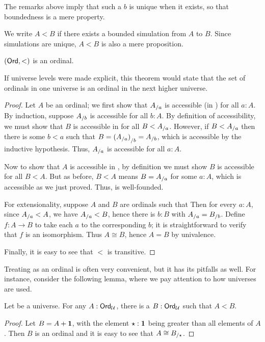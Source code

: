 The remarks above imply that such a $b$ is unique when it exists, so that boundedness is a mere property.

We write $A<B$ if there exists a bounded simulation from $A$ to $B$.
Since simulations are unique, $A<B$ is also a mere proposition.

\begin{thm}\label{thm:ordord}
  $(\mathsf{Ord},<)$ is an ordinal.
\end{thm}

\begin{rmk}
  If universe levels were made explicit, this theorem would state that the set of ordinals in one universe is an ordinal in the next higher universe.
\end{rmk}

\begin{proof}
  Let $A$ be an ordinal; we first show that ${A}_{/a}$ is accessible (in \ord) for all $a:A$.
  By induction, suppose ${A}_{/b}$ is accessible for all $b:A$.
  By definition of accessibility, we must show that $B$ is accessible in \ord for all $B<{A}_{/a}$.
  However, if $B<{A}_{/a}$ then there is some $b<a$ such that $B = {({A}_{/a})}_{/b} = {A}_{/b}$, which is accessible by the inductive hypothesis.
  Thus, ${A}_{/a}$ is accessible for all $a:A$.

  Now to show that $A$ is accessible in \ord, by definition we must show $B$ is accessible for all $B<A$.
  But as before, $B<A$ means $B={A}_{/a}$ for some $a:A$, which is accessible as we just proved.
  Thus, \ord is well-founded.

  For extensionality, suppose $A$ and $B$ are ordinals such that
  Then for every $a:A$, since ${A}_{/a}<A$, we have ${A}_{/a}<B$, hence there is $b:B$ with ${A}_{/a} = {B}_{/b}$.
  Define $f:A\to B$ to take each $a$ to the corresponding $b$; it is straightforward to verify that $f$ is an isomorphism.
  Thus $A\cong B$, hence $A=B$ by univalence.

  Finally, it is easy to see that $<$ is transitive.
\end{proof}

Treating \ord as an ordinal is often very convenient, but it has its pitfalls as well.
For instance, consider the following lemma, where we pay attention to how universes are used.

\begin{lem}\label{thm:ordsucc}
  Let \bbU be a universe.
  For any $A:\mathsf{Ord}_\mathcal{U}$, there is a $B:\mathsf{Ord}_\mathcal{U}$ such that $A<B$.
\end{lem}
\begin{proof}
  Let $B=A+\mathbf{1}$, with the element $\star:\mathbf{1}$ being greater than all elements of $A$.
  Then $B$ is an ordinal and it is easy to see that $A\cong {B}_{/\star}$.
\end{proof}

